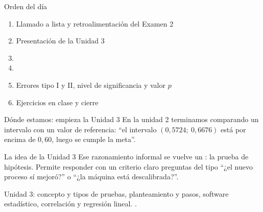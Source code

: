 \documentclass[aspectratio=169,10pt]{beamer}
\begin{document}
\portada

\begin{frame}{Orden del día}
  \begin{enumerate}
    \item Llamado a lista y retroalimentación del Examen 2
    \item Presentación de la Unidad 3
    \item {}
    \item {}
    \item Errores tipo I y II, nivel de significancia y valor $p$
    \item Ejercicios en clase y cierre
  \end{enumerate}
\end{frame}

\begin{frame}{Dónde estamos: empieza la Unidad 3}
  En la unidad 2 terminamos comparando un intervalo con un valor de
  referencia: ``el intervalo $(0{,}5724;\ 0{,}6676)$ está por encima de
  $0{,}60$, luego se cumple la meta''.

  \vspace{0.2cm}
  \begin{alertblock}{La idea de la Unidad 3}
    \footnotesize
    Ese razonamiento informal se vuelve un : la prueba de hipótesis. Permite responder con un criterio claro
    preguntas del tipo ``¿el nuevo proceso sí mejoró?'' o ``¿la máquina está
    descalibrada?''.
  \end{alertblock}

  \vspace{0.15cm}
  {\footnotesize\color{uniGris} Unidad 3: concepto y tipos de pruebas,
  planteamiento y pasos, software estadístico, correlación y regresión lineal.
  .}
\end{frame}

\end{document}
